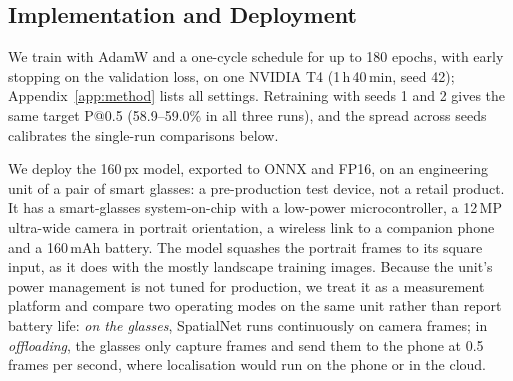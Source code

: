 \subsection{Implementation and Deployment}\label{sec:device}
We train with AdamW and a one-cycle schedule for up to 180 epochs, with early stopping on the validation loss, on one NVIDIA T4 (1\,h\,40\,min, seed 42); Appendix~\ref{app:method} lists all settings. Retraining with seeds 1 and 2 gives the same target P@0.5 (58.9--59.0\% in all three runs), and the spread across seeds calibrates the single-run comparisons below.

We deploy the 160\,px model, exported to ONNX and FP16, on an engineering unit of a pair of smart glasses: a pre-production test device, not a retail product. It has a smart-glasses system-on-chip with a low-power microcontroller, a 12\,MP ultra-wide camera in portrait orientation, a wireless link to a companion phone and a 160\,mAh battery. The model squashes the portrait frames to its square input, as it does with the mostly landscape training images. Because the unit's power management is not tuned for production, we treat it as a measurement platform and compare two operating modes on the same unit rather than report battery life: \emph{on the glasses}, SpatialNet runs continuously on camera frames; in \emph{offloading}, the glasses only capture frames and send them to the phone at 0.5 frames per second, where localisation would run on the phone or in the cloud.
